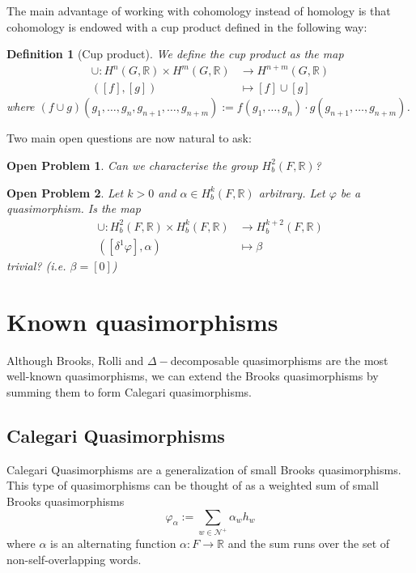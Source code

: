 \documentclass[leqno]{article}
\newtheorem*{definition}{Definition}
\newtheorem*{openproblem}{Open Problem}
\begin{document}
The main advantage of working with cohomology instead of homology is that cohomology is endowed with a cup product defined in the following way:

 \begin{definition}[Cup product] We define the cup product as the map
\begin{align*}
  \cup : H^n(G, \mathbb{R}) \times H^m(G, \mathbb{R}) &\to H^{n+m}(G, \mathbb{R}) \\
  ([f], [g]) & \mapsto [f]\cup [g] 
\end{align*} 
where $(f\cup g)(g_1, \ldots, g_n, g_{n+1}, \ldots, g_{n+m}) := f(g_1, \ldots, g_n)\cdot g(g_{n+1}, \ldots, g_{n+m})$.
\end{definition}

Two main open questions are now natural to ask:

\begin{openproblem} Can we characterise the group $H^2_b(F, \mathbb{R})$?
\end{openproblem}

\begin{openproblem} Let  $k>0$ and  $\alpha \in H^k_b(F, \mathbb{R})$ arbitrary. Let $\varphi $ be a quasimorphism. Is  the map
  \begin{align*}
	\cup : H^2_b(F, \mathbb{R}) \times H_b^k(F, \mathbb{R}) &\to H^{k+2}_b(F, \mathbb{R}) \\
	([\delta^1\varphi], \alpha ) &\mapsto \beta 
  \end{align*}
  trivial? (i.e. $\beta =[0]$)
\end{openproblem}

\section{Known quasimorphisms} 
Although Brooks, Rolli and $\Delta -$decomposable quasimorphisms are the most well-known quasimorphisms, we can extend the Brooks quasimorphisms by summing them to form Calegari quasimorphisms.

\subsection{Calegari Quasimorphisms}
Calegari Quasimorphisms are a generalization of small Brooks quasimorphisms. This type of quasimorphisms can be thought of as a weighted sum of small Brooks quasimorphisms
\[
\varphi _\alpha := \sum_{w\in \mathcal{N}^+} \alpha _w h_w
\] 
where $\alpha $ is an alternating function $\alpha :F\to \mathbb{R}$ and the sum runs over the set of non-self-overlapping words.
\end{document}
